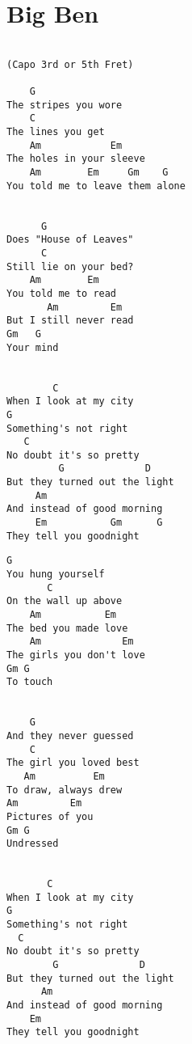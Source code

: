 \documentclass[leqno]{memoir}
\begin{document}
\chapter{Big Ben}
\begin{verbatim}

(Capo 3rd or 5th Fret)

    G
The stripes you wore
    C
The lines you get
    Am            Em
The holes in your sleeve
    Am        Em     Gm    G
You told me to leave them alone


      G
Does "House of Leaves"
      C
Still lie on your bed?
    Am        Em
You told me to read
       Am         Em
But I still never read
Gm   G
Your mind


        C
When I look at my city
G
Something's not right
   C
No doubt it's so pretty
         G              D
But they turned out the light
     Am         
And instead of good morning
     Em           Gm      G
They tell you goodnight

\end{verbatim}
\newpage
\begin{verbatim}
G
You hung yourself
       C
On the wall up above
    Am           Em
The bed you made love
    Am              Em
The girls you don't love
Gm G
To touch


    G
And they never guessed
    C
The girl you loved best
   Am          Em
To draw, always drew
Am         Em
Pictures of you
Gm G
Undressed


       C
When I look at my city
G
Something's not right
  C
No doubt it's so pretty
        G              D
But they turned out the light
      Am
And instead of good morning
    Em
They tell you goodnight
\end{verbatim}
\newpage
\end{document}
